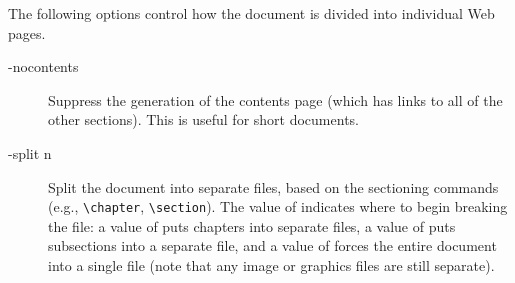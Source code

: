 \documentclass[twoside]{doctext/linfoem}
\begin{document}
The following options control how the document is divided into individual Web
pages.
\begin{description}
\item[-nocontents]Suppress the generation of the contents page (which has
links to all of the other sections).  This is useful for short documents.

\item[-split n]Split the document into separate files, based on the sectioning
commands (e.g., \verb+\chapter+, \verb+\section+).
The value of  indicates where to begin breaking the file: a value of
 puts chapters into separate files, a value of  puts
subsections into a separate file, and a value of  forces the entire
document into a single file (note that any image or graphics files are still
separate).
\end{description}
\end{document}
